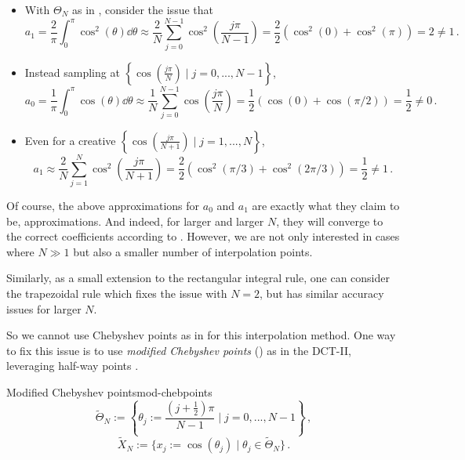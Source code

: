 \documentclass[12pt, a4paper]{article}
\newcommand{\chebyshev}{Chebyshev\xspace}
\begin{document}
  \begin{itemize}
    \item With $\Theta_N$ as in , consider the issue that
          $$a_1 = \frac{2}{\pi} \int_{0}^{\pi} \cos^2(\theta) \dd\theta \approx \frac{2}{N} \sum_{j=0}^{N-1} \cos^2\left(\frac{j \pi}{N-1}\right) = \frac{2}{2} \left(\cos^2(0) + \cos^2(\pi)\right) = 2 \neq 1 \,.$$
    \item Instead sampling at $\left\{\cos\left(\frac{j\pi}{N}\right) \;\big|\; j = 0, ..., N-1\right\}$,
          $$a_0 = \frac{1}{\pi} \int_0^\pi \cos(\theta) \dd\theta \approx \frac{1}{N} \sum_{j=0}^{N-1} \cos(\frac{j\pi}{N}) = \frac{1}{2} \left(\cos(0) + \cos(\pi/2)\right) = \frac{1}{2} \neq 0 \,.$$
    \item Even for a creative $\left\{\cos\left(\frac{j\pi}{N+1}\right) \;\big|\; j = 1, ..., N\right\}$,
          $$a_1 \approx \frac{2}{N} \sum_{j=1}^{N} \cos^2\left(\frac{j \pi}{N+1}\right) = \frac{2}{2} \left(\cos^2(\pi/3) + \cos^2(2\pi/3)\right) = \frac{1}{2} \neq 1 \,.$$
  \end{itemize}

  Of course, the above approximations for $a_0$ and $a_1$ are exactly what they claim to be, approximations.
  And indeed, for larger and larger $N$, they will converge to the correct coefficients according to .
  However, we are not only interested in cases where $N \gg 1$ but also a smaller number of interpolation points.

  Similarly, as a small extension to the rectangular integral rule, one can consider the trapezoidal rule which fixes the issue with $N = 2$, but has similar accuracy issues for larger $N$.

  So we cannot use \chebyshev points as in  for this interpolation method.
  One way to fix this issue is to use \emph{modified \chebyshev points} () as in the DCT-II, leveraging half-way points \parencite{CombTrig}.

  \begin{definition}{Modified Chebyshev points}{mod-chebpoints}
    $$\tilde{\Theta}_N := \left\{\theta_j := \frac{(j + \frac{1}{2})\pi}{N-1} \;\bigg|\; j = 0, ..., N-1\right\} \,,$$
    $$\tilde{X}_N := \{x_j := \cos(\theta_j) \;|\; \theta_j \in \tilde{\Theta}_N\} \,.$$
  \end{definition}
\end{document}
